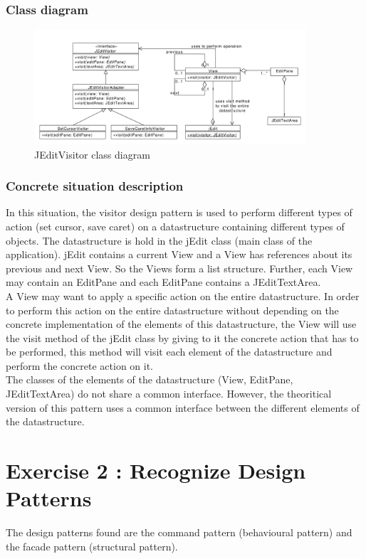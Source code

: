 \documentclass[a4paper,10pt]{article}
\begin{document}
\subsubsection{Class diagram}
\begin{center}
\begin{figure}[h]
  \centerline{\includegraphics[width=0.9\textwidth]{visitor-jeditvisitor-class-diagram.pdf}}
  \caption{JEditVisitor class diagram}
\end{figure}
\end{center}
\subsubsection{Concrete situation description}
In this situation, the visitor design pattern is used to perform different types of action (set cursor, save caret) on a datastructure containing different types of objects. The datastructure is hold in the jEdit class (main class of the application). jEdit contains a current View and a View has references about its previous and next View. So the Views form a list structure. Further, each View may contain an EditPane and each EditPane contains a JEditTextArea.\\
A View may want to apply a specific action on the entire datastructure. In order to perform this action on the entire datastructure without depending on the concrete implementation of the elements of this datastructure, the View will use the visit method of the jEdit class by giving to it the concrete action that has to be performed, this method will visit each element of the datastructure and perform the concrete action on it.\\
The classes of the elements of the datastructure (View, EditPane, JEditTextArea) do not share a common interface. However, the theoritical version of this pattern uses a common interface between the different elements of the datastructure.


\section{Exercise 2 : Recognize Design Patterns}
The design patterns found are the command pattern (behavioural pattern) and the facade pattern (structural pattern).
\end{document}
